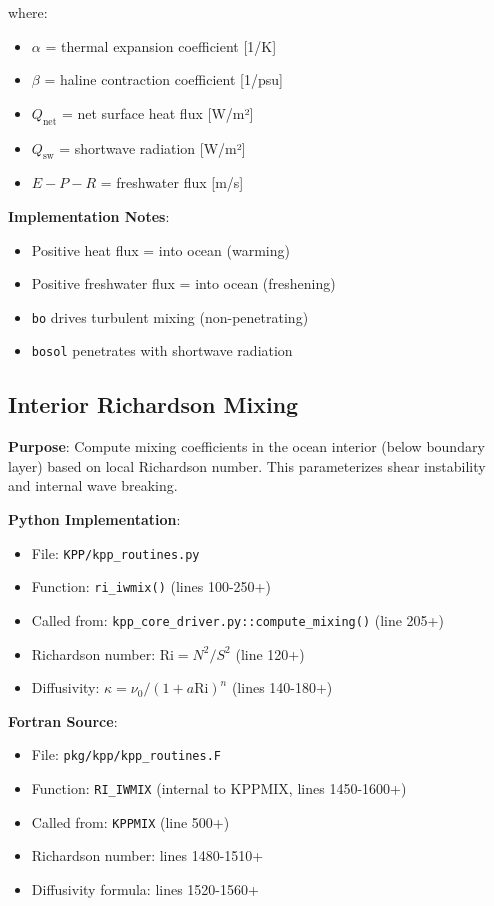 \documentclass[11pt]{article}
\begin{document}
where:
\begin{itemize}
    \item $\alpha$ = thermal expansion coefficient [1/K]
    \item $\beta$ = haline contraction coefficient [1/psu]
    \item $Q_{\text{net}}$ = net surface heat flux [W/m²]
    \item $Q_{\text{sw}}$ = shortwave radiation [W/m²]
    \item $E - P - R$ = freshwater flux [m/s]
\end{itemize}

\textbf{Implementation Notes}:
\begin{itemize}
    \item Positive heat flux = into ocean (warming)
    \item Positive freshwater flux = into ocean (freshening)
    \item \verb|bo| drives turbulent mixing (non-penetrating)
    \item \verb|bosol| penetrates with shortwave radiation
\end{itemize}

\subsection{Interior Richardson Mixing}

\textbf{Purpose}: Compute mixing coefficients in the ocean interior (below boundary layer) based on local Richardson number. This parameterizes shear instability and internal wave breaking.

\textbf{Python Implementation}:
\begin{itemize}
    \item File: \verb|KPP/kpp_routines.py|
    \item Function: \verb|ri_iwmix()| (lines 100-250+)
    \item Called from: \verb|kpp_core_driver.py::compute_mixing()| (line 205+)
    \item Richardson number: $\text{Ri} = N^2 / S^2$ (line 120+)
    \item Diffusivity: $\kappa = \nu_0 / (1 + a \text{Ri})^n$ (lines 140-180+)
\end{itemize}

\textbf{Fortran Source}:
\begin{itemize}
    \item File: \verb|pkg/kpp/kpp_routines.F|
    \item Function: \verb|RI_IWMIX| (internal to KPPMIX, lines 1450-1600+)
    \item Called from: \verb|KPPMIX| (line 500+)
    \item Richardson number: lines 1480-1510+
    \item Diffusivity formula: lines 1520-1560+
\end{itemize}
\end{document}
